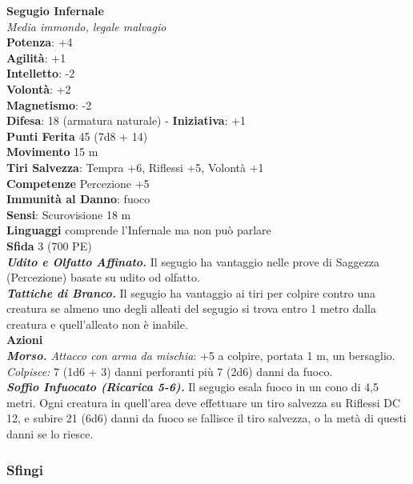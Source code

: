 \begin{multicols}{2}
\medskip\textbf{Segugio Infernale}\\
\emph{Media immondo, legale malvagio}\\
\textbf{Potenza}: +4\\
\textbf{Agilità}: +1\\
\textbf{Intelletto}: -2\\
\textbf{Volontà}: +2\\
\textbf{Magnetismo}: -2\\
\textbf{Difesa}: 18 (armatura naturale) - \textbf{Iniziativa}: +1\\
\textbf{Punti Ferita} 45 (7d8 + 14)\\
\textbf{Movimento} 15 m\\
\textbf{Tiri Salvezza}: Tempra +6, Riflessi +5, Volontà +1\\
\textbf{Competenze} Percezione +5\\
\textbf{Immunità al Danno}: fuoco\\
\textbf{Sensi}: Scurovisione 18 m\\
\textbf{Linguaggi} comprende l'Infernale ma non può parlare\\
\textbf{Sfida} 3 (700 PE)\smallskip\\
\emph{\textbf{Udito e Olfatto Affinato.}} Il segugio ha vantaggio nelle prove di Saggezza (Percezione) basate su udito od olfatto.\\
\emph{\textbf{Tattiche di Branco.}} Il segugio ha vantaggio ai tiri per colpire contro una creatura se almeno uno degli alleati del segugio si trova entro 1 metro dalla creatura e quell'alleato non è inabile.\\
\smallskip\textbf{Azioni}\\
\emph{\textbf{Morso.} Attacco con arma da mischia}: +5 a colpire, portata 1 m, un bersaglio.\\
\emph{Colpisce:} 7 (1d6 + 3) danni perforanti più 7 (2d6) danni da fuoco.\\
\emph{\textbf{Soffio Infuocato (Ricarica 5-6).}} Il segugio esala fuoco in un cono di 4,5 metri. Ogni creatura in quell'area deve effettuare un tiro salvezza su Riflessi DC 12, e subire 21 (6d6) danni da fuoco se fallisce il tiro salvezza, o la metà di questi danni se lo riesce.\\

\subsubsection{Sfingi}


\end{multicols}
